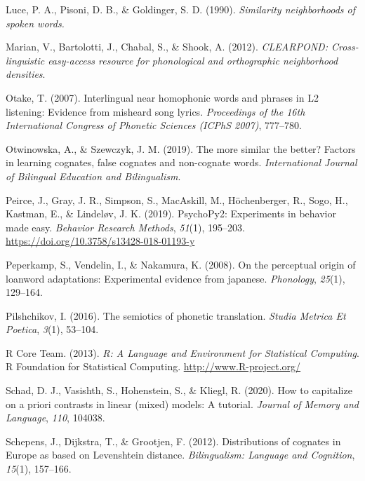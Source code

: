 \documentclass[
  man,
  longtable,
  nolmodern,
  notxfonts,
  notimes,
  colorlinks=true,linkcolor=blue,citecolor=blue,urlcolor=blue]{apa7}
\newlength{\cslhangindent}
\newenvironment{CSLReferences}[2] %
 {\begin{list}{}{%
  \setlength{\itemindent}{0pt}
  \setlength{\leftmargin}{0pt}
  \setlength{\parsep}{0pt}
  \ifodd #1
   \setlength{\leftmargin}{\cslhangindent}
   \setlength{\itemindent}{-1\cslhangindent}
  \fi
  \setlength{\itemsep}{#2\baselineskip}}}
 {\end{list}}
\begin{document}
\begin{CSLReferences}{1}{0}
Luce, P. A., Pisoni, D. B., \& Goldinger, S. D. (1990). \emph{Similarity
neighborhoods of spoken words.}

Marian, V., Bartolotti, J., Chabal, S., \& Shook, A. (2012).
\emph{{CLEARPOND}: {Cross-linguistic} easy-access resource for
phonological and orthographic neighborhood densities}.

Otake, T. (2007). Interlingual near homophonic words and phrases in L2
listening: Evidence from misheard song lyrics. \emph{Proceedings of the
16th International Congress of Phonetic Sciences (ICPhS 2007)},
777--780.

Otwinowska, A., \& Szewczyk, J. M. (2019). The more similar the better?
Factors in learning cognates, false cognates and non-cognate words.
\emph{International Journal of Bilingual Education and Bilingualism}.

Peirce, J., Gray, J. R., Simpson, S., MacAskill, M., Höchenberger, R.,
Sogo, H., Kastman, E., \& Lindeløv, J. K. (2019). {PsychoPy2}:
{Experiments} in behavior made easy. \emph{Behavior Research Methods},
\emph{51}(1), 195--203. \url{https://doi.org/10.3758/s13428-018-01193-y}

Peperkamp, S., Vendelin, I., \& Nakamura, K. (2008). On the perceptual
origin of loanword adaptations: Experimental evidence from japanese.
\emph{Phonology}, \emph{25}(1), 129--164.

Pilshchikov, I. (2016). The semiotics of phonetic translation.
\emph{Studia Metrica Et Poetica}, \emph{3}(1), 53--104.

R Core Team. (2013). \emph{R: {A Language} and {Environment} for
{Statistical Computing}}. R Foundation for Statistical Computing.
\url{http://www.R-project.org/}

Schad, D. J., Vasishth, S., Hohenstein, S., \& Kliegl, R. (2020). How to
capitalize on a priori contrasts in linear (mixed) models: {A} tutorial.
\emph{Journal of Memory and Language}, \emph{110}, 104038.

Schepens, J., Dijkstra, T., \& Grootjen, F. (2012). Distributions of
cognates in {Europe} as based on {Levenshtein} distance.
\emph{Bilingualism: Language and Cognition}, \emph{15}(1), 157--166.


\end{CSLReferences}
\end{document}
